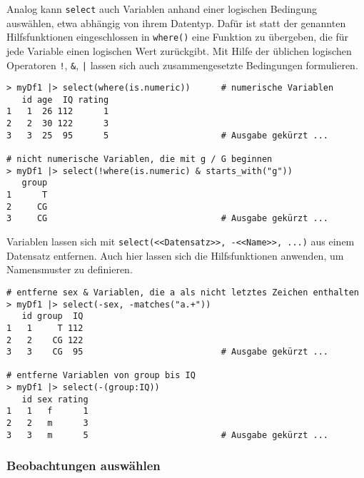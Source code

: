 Analog kann \lstinline!select! auch Variablen anhand einer logischen Bedingung auswählen, etwa abhängig von ihrem Datentyp. Dafür ist statt der genannten Hilfsfunktionen eingeschlossen in \lstinline!where()! eine Funktion zu übergeben, die für jede Variable einen logischen Wert zurückgibt. Mit Hilfe der üblichen logischen Operatoren \lstinline|!|, \lstinline!&!, \lstinline!|! lassen sich auch zusammengesetzte Bedingungen formulieren.
\begin{lstlisting}
> myDf1 |> select(where(is.numeric))      # numerische Variablen
   id age  IQ rating
1   1  26 112      1
2   2  30 122      3
3   3  25  95      5                      # Ausgabe gekürzt ...

# nicht numerische Variablen, die mit g / G beginnen
> myDf1 |> select(!where(is.numeric) & starts_with("g"))
   group
1      T
2     CG
3     CG                                  # Ausgabe gekürzt ...
\end{lstlisting}

Variablen lassen sich mit \lstinline!select(<<Datensatz>>, -<<Name>>, ...)! aus einem Datensatz entfernen. Auch hier lassen sich die Hilfsfunktionen anwenden, um Namensmuster zu definieren.
\begin{lstlisting}
# entferne sex & Variablen, die a als nicht letztes Zeichen enthalten
> myDf1 |> select(-sex, -matches("a.+"))
   id group  IQ
1   1     T 112
2   2    CG 122
3   3    CG  95                           # Ausgabe gekürzt ...

# entferne Variablen von group bis IQ
> myDf1 |> select(-(group:IQ))
   id sex rating
1   1   f      1
2   2   m      3
3   3   m      5                          # Ausgabe gekürzt ...
\end{lstlisting}

\subsubsection{Beobachtungen auswählen}

